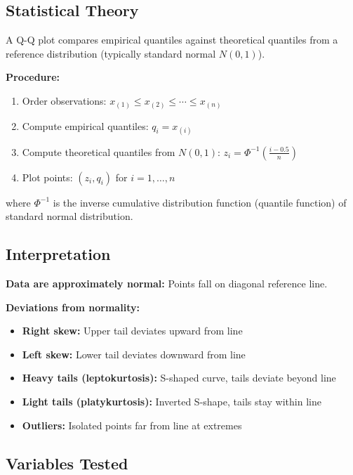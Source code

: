 \documentclass[12pt,a4paper]{article}
\begin{document}
\subsection{Statistical Theory}

A Q-Q plot compares empirical quantiles against theoretical quantiles from a reference distribution (typically standard normal $N(0,1)$).

\textbf{Procedure:}
\begin{enumerate}
    \item Order observations: $x_{(1)} \leq x_{(2)} \leq \cdots \leq x_{(n)}$
    \item Compute empirical quantiles: $q_i = x_{(i)}$
    \item Compute theoretical quantiles from $N(0,1)$: $z_i = \Phi^{-1}\left(\frac{i - 0.5}{n}\right)$
    \item Plot points: $(z_i, q_i)$ for $i = 1, \ldots, n$
\end{enumerate}

where $\Phi^{-1}$ is the inverse cumulative distribution function (quantile function) of standard normal distribution.

\subsection{Interpretation}

\textbf{Data are approximately normal:} Points fall on diagonal reference line.

\textbf{Deviations from normality:}
\begin{itemize}
    \item \textbf{Right skew:} Upper tail deviates upward from line
    \item \textbf{Left skew:} Lower tail deviates downward from line
    \item \textbf{Heavy tails (leptokurtosis):} S-shaped curve, tails deviate beyond line
    \item \textbf{Light tails (platykurtosis):} Inverted S-shape, tails stay within line
    \item \textbf{Outliers:} Isolated points far from line at extremes
\end{itemize}

\subsection{Variables Tested}
\end{document}
